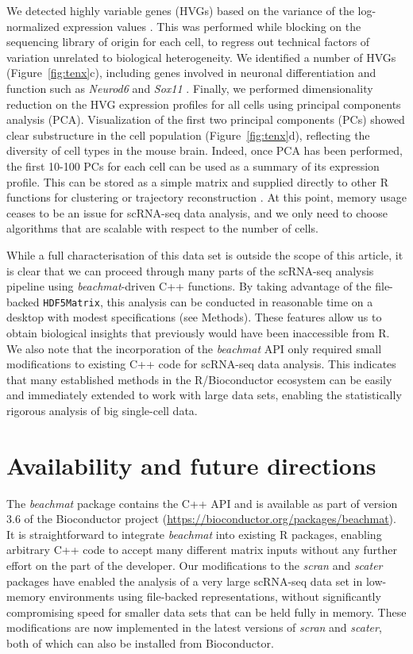 \documentclass[10pt,letterpaper]{article}
\newcommand{\beachmat}{\textit{beachmat}}
\newcommand{\code}[1]{\texttt{#1}}
\begin{document}
We detected highly variable genes (HVGs) based on the variance of the log-normalized expression values \cite{lun2016stepbystep}.
This was performed while blocking on the sequencing library of origin for each cell, to regress out technical factors of variation unrelated to biological heterogeneity.
We identified a number of HVGs (Figure~\ref{fig:tenx}c), including genes involved in neuronal differentiation and function such as \textit{Neurod6} \cite{ kay2011neurod6} and \textit{Sox11} \cite{bergsland2006establishment}. 
Finally, we performed dimensionality reduction on the HVG expression profiles for all cells using principal components analysis (PCA).
Visualization of the first two principal components (PCs) showed clear substructure in the cell population (Figure~\ref{fig:tenx}d), reflecting the diversity of cell types in the mouse brain.
Indeed, once PCA has been performed, the first 10-100 PCs for each cell can be used as a summary of its expression profile.
This can be stored as a simple matrix and supplied directly to other R functions for clustering \cite{xu2015identification,csardi2006igraph} or trajectory reconstruction \cite{trapnell2014dynamics}.
At this point, memory usage ceases to be an issue for scRNA-seq data analysis, and we only need to choose algorithms that are scalable with respect to the number of cells.

While a full characterisation of this data set is outside the scope of this article, it is clear that we can proceed through many parts of the scRNA-seq analysis pipeline using \beachmat{}-driven C++ functions.
By taking advantage of the file-backed \code{HDF5Matrix}, this analysis can be conducted in reasonable time on a desktop with modest specifications (see Methods).
These features allow us to obtain biological insights that previously would have been inaccessible from R.
We also note that the incorporation of the \beachmat{} API only required small modifications to existing C++ code for scRNA-seq data analysis.
This indicates that many established methods in the R/Bioconductor ecosystem can be easily and immediately extended to work with large data sets,
enabling the statistically rigorous analysis of big single-cell data.

\section*{Availability and future directions}
The \beachmat{} package contains the C++ API and is available as part of version 3.6 of the Bioconductor project (\url{https://bioconductor.org/packages/beachmat}).
It is straightforward to integrate \beachmat{} into existing R packages, enabling arbitrary C++ code to accept many different matrix inputs without any further effort on the part of the developer.
Our modifications to the \textit{scran} and \textit{scater} packages have enabled the analysis of a very large scRNA-seq data set in low-memory environments using file-backed representations, without significantly compromising speed for smaller data sets that can be held fully in memory.
These modifications are now implemented in the latest versions of \textit{scran} and \textit{scater}, both of which can also be installed from Bioconductor.
\end{document}
